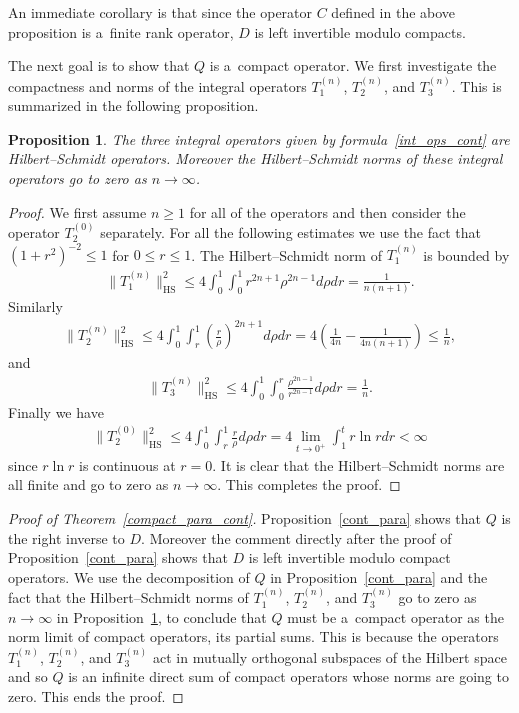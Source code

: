 \documentclass[11pt]{article}
\numberwithin{equation}{section}
\newtheorem{prop}[theo]{Proposition}
{\theoremstyle{definition}
\newtheorem{rem}[theo]{Remark}
\newtheorem{defin}[theo]{Definition}
}
\begin{document}
An immediate corollary is that since the operator $C$ def\/ined in the above proposition is a~f\/inite rank operator, $D$ is
left invertible modulo compacts.

The next goal is to show that $Q$ is a~compact operator.
We f\/irst investigate the compactness and norms of the integral operators $T_1^{(n)}$, $T_2^{(n)}$, and $T_3^{(n)}$.
This is summarized in the following proposition.

\begin{prop}
\label{hs_norm_cont_T}
The three integral operators given by formula~\eqref{int_ops_cont} are Hilbert--Schmidt ope\-rators.
Moreover the Hilbert--Schmidt norms of these integral operators go to zero as $n\to\infty$.
\end{prop}

\begin{proof}
We f\/irst assume $n\ge1$ for all of the operators and then consider the operator $T_2^{(0)}$ separately.
For all the following estimates we use the fact that $(1+r^2)^{-2} \le 1$ for $0\le r\le 1$.
The Hilbert--Schmidt norm of $T_1^{(n)}$ is bounded by
\begin{gather*}
\|T_1^{(n)}\|_{\textrm{HS}}^2 \le 4\int_0^1\int_0^1r^{2n+1}\rho^{2n-1}d\rho dr =\frac{1}{n(n+1)}.
\end{gather*}
Similarly
\begin{gather*}
\|T_2^{(n)}\|_{\textrm{HS}}^2 \le 4\int_0^1\int_r^1 \left(\frac{r}{\rho}\right)^{2n+1}d\rho dr=4\left(\frac{1}{4n}-
\frac{1}{4n(n+1)}\right) \le \frac{1}{n},
\end{gather*}
and
\begin{gather*}
\|T_3^{(n)}\|_{\textrm{HS}}^2 \le 4\int_0^1\int_0^r \frac{\rho^{2n-1}}{r^{2n-1}}d\rho dr = \frac{1}{n}.
\end{gather*}
Finally we have
\begin{gather*}
\big\|T_2^{(0)}\big\|_{\textrm{HS}}^2 \le 4 \int_0^1 \int_r^1 \frac{r}{\rho}d\rho dr = 4\lim_{t\to0^+}\int_1^t r\ln r dr
<\infty
\end{gather*}
since $r\ln r$ is continuous at $r=0$.
It is clear that the Hilbert--Schmidt norms are all f\/inite and go to zero as $n\to\infty$.
This completes the proof.
\end{proof}

\begin{proof}[Proof of Theorem~\ref{compact_para_cont}] Proposition~\ref{cont_para} shows that $Q$ is the right inverse to $D$.
Moreover the comment directly after the proof of Proposition~\ref{cont_para} shows that $D$ is left invertible modulo
compact operators.
We use the decomposition of $Q$ in Proposition~\ref{cont_para} and the fact that the Hilbert--Schmidt norms of
$T_1^{(n)}$, $T_2^{(n)}$, and $T_3^{(n)}$ go to zero as $n\to\infty$ in Proposition~\ref{hs_norm_cont_T}, to conclude
that $Q$ must be a~compact operator as the norm limit of compact operators, its partial sums.
This is because the operators $T_1^{(n)}$, $T_2^{(n)}$, and $T_3^{(n)}$ act in mutually orthogonal subspaces of the
Hilbert space and so $Q$ is an inf\/inite direct sum of compact operators whose norms are going to zero.
This ends the proof.
\end{proof}
\end{document}
